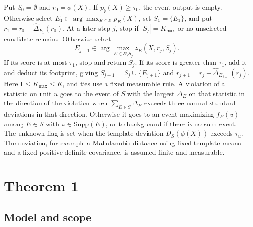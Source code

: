 \documentclass[10pt]{article}
\newcommand{\E}{\mathcal{E}}
\newcommand{\Supp}{\mathrm{Supp}}
\theoremstyle{plain}
\theoremstyle{remark}
\begin{document}
Put $S_0=\emptyset$ and $r_0=\phi(X)$. If $p_\emptyset(X)\ge\tau_0$, the event output is empty. Otherwise select $E_1\in\arg\max_{E\in\E}p_E(X)$, set $S_1=\{E_1\}$, and put $r_1=r_0-\hat\Delta_{E_1}(r_0)$. At a later step $j$, stop if $|S_j|=K_{\max}$ or no unselected candidate remains. Otherwise select
\[
 E_{j+1}\in\arg\max_{E\in\E\setminus S_j}z_E(X,r_j,S_j).
\]
If its score is at most $\tau_1$, stop and return $S_j$. If its score is greater than $\tau_1$, add it and deduct its footprint, giving $S_{j+1}=S_j\cup\{E_{j+1}\}$ and $r_{j+1}=r_j-\hat\Delta_{E_{j+1}}(r_j)$. Here $1\le K_{\max}\le K$, and ties use a fixed measurable rule. A violation of a statistic on unit $u$ goes to the event of $S$ with the largest $\bar\Delta_E$ on that statistic in the direction of the violation when $\sum_{E\in S}\bar\Delta_E$ exceeds three normal standard deviations in that direction. Otherwise it goes to an event maximizing $f_E(u)$ among $E\in S$ with $u\in\Supp(E)$, or to background if there is no such event. The unknown flag is set when the template deviation $D_{S}(\phi(X))$ exceeds $\tau_u$. The deviation, for example a Mahalanobis distance using fixed template means and a fixed positive-definite covariance, is assumed finite and measurable.

\section{Theorem 1}
\label{sec:s-map}

\subsection{Model and scope}
\end{document}
